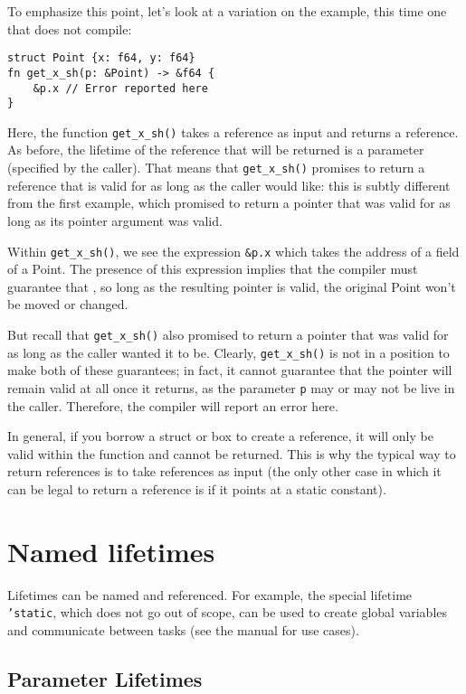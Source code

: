 \documentclass[]{article}
\begin{document}
To emphasize this point, let's look at a variation on the example, this
time one that does not compile:

\begin{verbatim}
struct Point {x: f64, y: f64}
fn get_x_sh(p: &Point) -> &f64 {
    &p.x // Error reported here
}
\end{verbatim}

Here, the function \texttt{get\_x\_sh()} takes a reference as input and
returns a reference. As before, the lifetime of the reference that will
be returned is a parameter (specified by the caller). That means that
\texttt{get\_x\_sh()} promises to return a reference that is valid for
as long as the caller would like: this is subtly different from the
first example, which promised to return a pointer that was valid for as
long as its pointer argument was valid.

Within \texttt{get\_x\_sh()}, we see the expression \texttt{\&p.x} which
takes the address of a field of a Point. The presence of this expression
implies that the compiler must guarantee that , so long as the resulting
pointer is valid, the original Point won't be moved or changed.

But recall that \texttt{get\_x\_sh()} also promised to return a pointer
that was valid for as long as the caller wanted it to be. Clearly,
\texttt{get\_x\_sh()} is not in a position to make both of these
guarantees; in fact, it cannot guarantee that the pointer will remain
valid at all once it returns, as the parameter \texttt{p} may or may not
be live in the caller. Therefore, the compiler will report an error
here.

In general, if you borrow a struct or box to create a reference, it will
only be valid within the function and cannot be returned. This is why
the typical way to return references is to take references as input (the
only other case in which it can be legal to return a reference is if it
points at a static constant).

\section{Named lifetimes}\label{named-lifetimes}

Lifetimes can be named and referenced. For example, the special lifetime
\texttt{'static}, which does not go out of scope, can be used to create
global variables and communicate between tasks (see the manual for use
cases).

\subsection{Parameter Lifetimes}\label{parameter-lifetimes}
\end{document}
